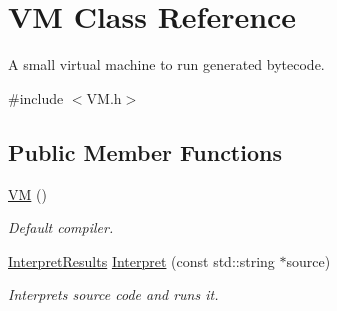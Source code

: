 \hypertarget{class_v_m}{}\section{VM Class Reference}
\label{class_v_m}


A small virtual machine to run generated bytecode.  




{\ttfamily \#include $<$V\+M.\+h$>$}

\subsection*{Public Member Functions}
\begin{DoxyCompactItemize}
\item 
\mbox{\label{class_v_m_a3502d27cf6a670f277221e8e6ac8b869}} 
\hyperlink{class_v_m_a3502d27cf6a670f277221e8e6ac8b869}{VM} ()
\begin{DoxyCompactList}\small\item\em Default compiler. \end{DoxyCompactList}\item 
\hyperlink{_v_m_8h_ae6d9431ba75ad63e3dc378957e0aad8f}{Interpret\+Results} \hyperlink{class_v_m_abc9d74981061a1ce81a0926d50bde682}{Interpret} (const std\+::string $\ast$source)
\begin{DoxyCompactList}\small\item\em Interprets source code and runs it. \end{DoxyCompactList}\end{DoxyCompactItemize}
